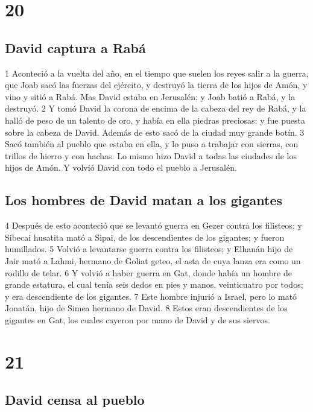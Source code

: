 \chapter{20}

\section*{David captura a Rabá}

 

1 Aconteció a la vuelta del año, en el tiempo que suelen los reyes salir a la guerra, que Joab sacó las fuerzas del ejército, y destruyó la tierra de los hijos de Amón, y vino y sitió a Rabá. Mas David estaba en Jerusalén; y Joab batió a Rabá, y la destruyó.
2 Y tomó David la corona de encima de la cabeza del rey de Rabá, y la halló de peso de un talento de oro,  y había en ella piedras preciosas; y fue puesta sobre la cabeza de David. Además de esto sacó de la ciudad muy grande botín.
3 Sacó también al pueblo que estaba en ella, y lo puso a trabajar con sierras, con trillos de hierro y con hachas. Lo mismo hizo David a todas las ciudades de los hijos de Amón. Y volvió David con todo el pueblo a Jerusalén.
\section*{Los hombres de David matan a los gigantes}

 
4 Después de esto aconteció que se levantó guerra en Gezer contra los filisteos; y Sibecai husatita mató a Sipai, de los descendientes de los gigantes; y fueron humillados.
5 Volvió a levantarse guerra contra los filisteos; y Elhanán hijo de Jair mató a Lahmi, hermano de Goliat geteo, el asta de cuya lanza era como un rodillo de telar. 
6 Y volvió a haber guerra en Gat, donde había un hombre de grande estatura, el cual tenía seis dedos en pies y manos, veinticuatro por todos; y era descendiente de los gigantes.
7 Este hombre injurió a Israel, pero lo mató Jonatán, hijo de Simea hermano de David.
8 Estos eran descendientes de los gigantes en Gat, los cuales cayeron por mano de David y de sus siervos.

\chapter{21}

\section*{David censa al pueblo }

